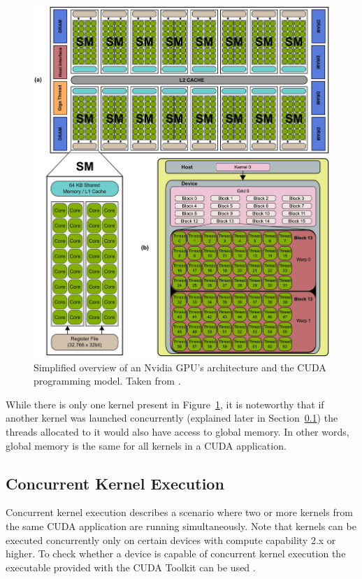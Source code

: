 \begin{figure}[ht!]
	\centering
	\includegraphics[width=\textwidth, keepaspectratio]{images/ch01/nvidia_gpu_architecture_and_cuda_structures.png}
	\caption{Simplified overview of an Nvidia GPU's architecture and the CUDA programming model.
		Taken from  \cite{Hernandez2015}.
	}
	\label{Figure:theory->CUDA->memory-management->nvidia-gpu-architecture-and-cuda-structures}
\end{figure}

While there is only one kernel present in Figure~\ref{Figure:theory->CUDA->memory-management->nvidia-gpu-architecture-and-cuda-structures}, it is noteworthy that if another kernel was launched concurrently (explained later in Section~\ref{Subsection:theory->CUDA->concurrent-kernel-execution}) the threads allocated to it would also have access to global memory.
In other words, global memory is the same for all kernels in a CUDA application.

\subsection{Concurrent Kernel Execution}\label{Subsection:theory->CUDA->concurrent-kernel-execution}
Concurrent kernel execution describes a scenario where two or more kernels from the same CUDA application are running simultaneously.
Note that kernels can be executed concurrently only on certain devices with compute capability 2.x or higher.
To check whether a device is capable of concurrent kernel execution the  executable provided with the CUDA Toolkit can be used \cite{NVIDIADecember2022}.

